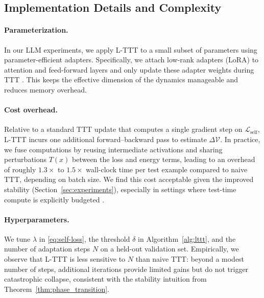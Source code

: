 \documentclass{article}
\theoremstyle{plain}
\theoremstyle{definition}
\theoremstyle{remark}
\newcommand{\Lyap}{\mathcal{V}}            %
\begin{document}
\subsection{Implementation Details and Complexity}

\paragraph{Parameterization.}
In our LLM experiments, we apply L-TTT to a small subset of parameters using parameter-efficient adapters. Specifically, we attach low-rank adapters (LoRA) to attention and feed-forward layers and only update these adapter weights during TTT \cite{templora2024,tlm2025,inplacettt2025}. This keeps the effective dimension of the dynamics manageable and reduces memory overhead.

\paragraph{Cost overhead.}
Relative to a standard TTT update that computes a single gradient step on $\mathcal{L}_{\text{self}}$, L-TTT incurs one additional forward–backward pass to estimate $\Delta \Lyap$. In practice, we fuse computations by reusing intermediate activations and sharing perturbations $T(x)$ between the loss and energy terms, leading to an overhead of roughly $1.3\times$ to $1.5\times$ wall-clock time per test example compared to naive TTT, depending on batch size. We find this cost acceptable given the improved stability (Section~\ref{sec:experiments}), especially in settings where test-time compute is explicitly budgeted \cite{snell2024scaling,ttcompute2025,deepseek2025}.

\paragraph{Hyperparameters.}
We tune $\lambda$ in \eqref{eq:self-loss}, the threshold $\delta$ in Algorithm~\ref{alg:lttt}, and the number of adaptation steps $N$ on a held-out validation set. Empirically, we observe that L-TTT is less sensitive to $N$ than naive TTT: beyond a modest number of steps, additional iterations provide limited gains but do not trigger catastrophic collapse, consistent with the stability intuition from Theorem~\ref{thm:phase_transition}.


\end{document}
